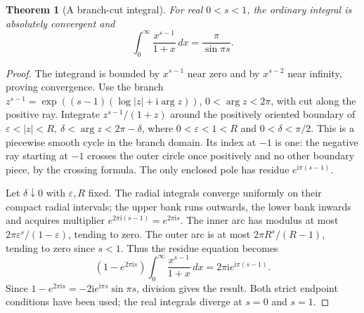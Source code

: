 \documentclass[11pt,a4paper,openany]{book}
\newtheorem{theorem}{Theorem}[chapter]
\theoremstyle{definition}
\theoremstyle{remark}\newtheorem{remark}[theorem]{Remark}
\newcommand{\eps}{\varepsilon}\newcommand{\ee}{\varepsilon}
\newcommand{\dd}{\,d}\newcommand{\iu}{\mathrm i}
\newcommand{\family}[1]{}
\begin{document}
\begin{theorem}[A branch-cut integral]\family{D12.08.07}\label{d12:08-07}
For real \(0<s<1\), the ordinary integral is absolutely convergent and
\[
 \int_0^\infty\frac{x^{s-1}}{1+x}\dd x=\frac{\pi}{\sin\pi s}.
\]
\end{theorem}
\begin{proof}
The integrand is bounded by \(x^{s-1}\) near zero and by \(x^{s-2}\)
near infinity, proving convergence.
Use the branch \(z^{s-1}=\exp((s-1)(\log|z|+\iu\arg z))\),
\(0<\arg z<2\pi\), with cut along the positive ray.
Integrate \(z^{s-1}/(1+z)\) around the positively oriented boundary
of \(\eps<|z|<R,\ \delta<\arg z<2\pi-\delta\), where
\(0<\eps<1<R\) and \(0<\delta<\pi/2\).
This is a piecewise smooth cycle in the branch domain. Its index at
\(-1\) is one: the negative ray starting at \(-1\) crosses the outer
circle once positively and no other boundary piece, by the crossing
formula. The only enclosed pole has residue \(e^{\iu\pi(s-1)}\).

Let \(\delta\downarrow0\) with \(\eps,R\) fixed. The radial integrals
converge uniformly on their compact radial intervals; the upper bank
runs outwards, the lower bank inwards and acquires multiplier
\(e^{2\pi\iu(s-1)}=e^{2\pi\iu s}\).
The inner arc has modulus at most
\(2\pi\eps^s/(1-\eps)\), tending to zero.
The outer arc is at most \(2\pi R^s/(R-1)\), tending to zero since
\(s<1\). Thus the residue equation becomes
\[
 (1-e^{2\pi\iu s})\int_0^\infty\frac{x^{s-1}}{1+x}\dd x
       =2\pi\iu e^{\iu\pi(s-1)}.
\]
Since \(1-e^{2\pi\iu s}=-2\iu e^{\iu\pi s}\sin\pi s\),
division gives the result. Both strict endpoint conditions have been
used; the real integrals diverge at \(s=0\) and \(s=1\).
\end{proof}
\end{document}
